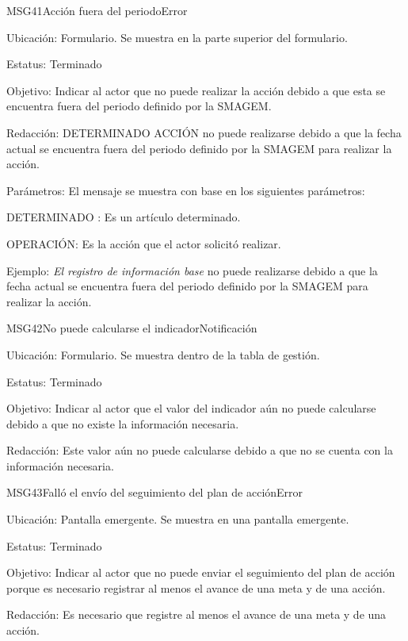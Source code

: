 \begin{mensaje}{MSG41}{Acción fuera del periodo}{Error}
\item[Ubicación:] Formulario. Se muestra en la parte superior del formulario.
\item[Estatus:] Terminado
\item[Objetivo:] Indicar al actor que no puede realizar la acción debido a que esta se encuentra fuera del periodo definido por la SMAGEM.
    \item[Redacción:] DETERMINADO ACCIÓN no puede realizarse debido a que la fecha actual se encuentra fuera del periodo definido por la SMAGEM para realizar la acción.
    \item[Parámetros:] El mensaje se muestra con base en los siguientes parámetros:
    \begin{Citemize}
	\item DETERMINADO : Es un artículo determinado.
	\item OPERACIÓN: Es la acción que el actor solicitó realizar.
    \end{Citemize}
    \item[Ejemplo:] {\em El registro de información base} no puede realizarse debido a que la fecha actual se encuentra fuera del periodo definido por la SMAGEM para realizar la acción.
\end{mensaje}
\begin{mensaje}{MSG42}{No puede calcularse el indicador}{Notificación}
\item[Ubicación:] Formulario. Se muestra dentro de la tabla de gestión.
\item[Estatus:] Terminado
\item[Objetivo:] Indicar al actor que el valor del indicador aún no puede calcularse debido a que no existe la información necesaria.
    \item[Redacción:] Este valor aún no puede calcularse debido a que no se cuenta con la información necesaria.
\end{mensaje}
\begin{mensaje}{MSG43}{Falló el envío del seguimiento del plan de acción}{Error}
\item[Ubicación:] Pantalla emergente. Se muestra en una pantalla emergente.
\item[Estatus:] Terminado
\item[Objetivo:] Indicar al actor que no puede enviar el seguimiento del plan de acción porque es necesario registrar al menos el avance de una meta y de una acción.
\item[Redacción:] Es necesario que registre al menos el avance de una meta y de una acción.
\end{mensaje}